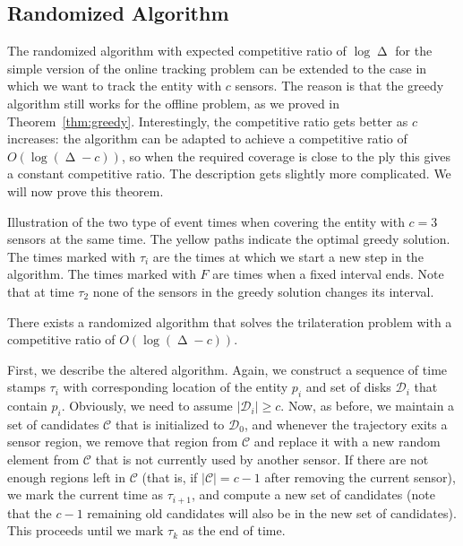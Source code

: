 \documentclass[runningheads]{llncs}
\newcommand {\script} [1] {\ensuremath {\mathcal {#1}}}
\DeclareMathOperator {\ply}{\Delta}
\newcommand{\marrow}{\marginpar[\hfill$\longrightarrow$]{$\longleftarrow$}}
\renewcommand{\remark}[3]{\textcolor{blue}{\textsc{#1 #2:}}
\textcolor{red}{\marrow\textsf{#3}}}
\renewcommand{\remark}[3]{\relax}
\newcommand{\maarten}[2][says]{\remark{Maarten}{#1}{#2}}
\begin{document}
  \subsection {Randomized Algorithm}
    \maarten {Ok, after thinking some more about it, it seems the algorithm extension is quite straightforward after all, it's just the analysis that gets a bit more complicated.}
    The randomized algorithm with expected competitive ratio of $\log \ply$ for the simple version of the online tracking problem can be extended to the case in which we want to track the entity with $c$ sensors.
    The reason is that the greedy algorithm still works for the offline problem, as we proved in Theorem~\ref {thm:greedy}.
    Interestingly, the competitive ratio gets better as $c$ increases:
    the algorithm can be adapted to achieve a competitive ratio of $O (\log (\ply-c))$, so when the required coverage is close to the ply this gives a constant competitive ratio. The description gets slightly more complicated. We will now prove this theorem.

     {Illustration of the two type of event times when covering the entity with $c=3$ sensors at the same time. The yellow paths indicate the optimal greedy solution. The times marked with $\tau_i$ are the times at which we start a new step in the algorithm. The times marked with $F$ are times when a fixed interval ends. Note that at time $\tau_2$ none of the sensors in the greedy solution changes its interval.}

\begin {theorem} \label {thm:trilateration-algorithm}
  There exists a randomized algorithm that solves the trilateration problem with a competitive ratio of $O (\log (\ply - c))$.
\end {theorem}

    First, we describe the altered algorithm.
    Again, we construct a sequence of time stamps $\tau_i$ with corresponding location of the entity $p_i$ and set of disks $\script D_i$ that contain $p_i$. Obviously, we need to assume $|\script D_i| \geq c$. Now, as before, we maintain a set of candidates $\script C$ that is initialized to $\script D_0$, and whenever the trajectory exits a sensor region, we remove that region from $\script C$ and replace it with a new random element from $\script C$ that is not currently used by another sensor. 
    If there are not enough regions left in $\script C$ (that is, if $|\script C| = c - 1$ after removing the current sensor), we mark the current time as $\tau_{i+1}$, and compute a new set of candidates (note that the $c-1$ remaining old candidates will also be in the new set of candidates). This proceeds until we mark $\tau_k$ as the end of time.
\maarten {need to add more pseudocode?}
\end{document}
